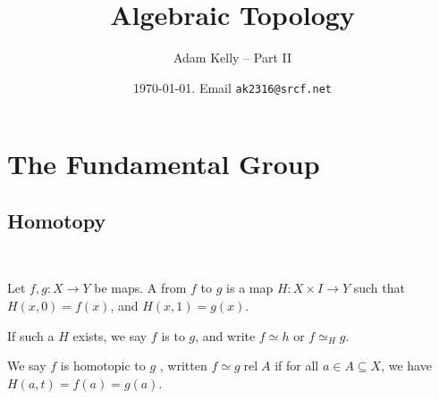 \documentclass[a4paper, 10pt, twocolumn]{amsart}
\title{Algebraic Topology}
\author{Adam Kelly -- Part II}
\date{\today. Email \texttt{ak2316@srcf.net}}
\newcommand{\rel}{\operatorname{rel}}
\begin{document}
\maketitle

\section{The Fundamental Group}

\subsection{Homotopy}\ 

\begin{definition}[Homotopy]
Let $f, g: X \rightarrow Y$ be maps. A  from $f$ to $g$ is a map
  $
  H: X \times I \rightarrow Y
  $
  such that
  $
  H(x, 0)=f(x)$, and $H(x, 1)=g(x)
  $.

  If such a $H$ exists, we say $f$ is  to $g$, and write $f \simeq h$ or $f \simeq_H g$.
\end{definition}

\begin{definition}
  We say $f$ is homotopic to $g$ , written $f \simeq g \rel A$ if for all $a \in A \subseteq X$, we have $H(a, t) = f(a) = g(a)$.
\end{definition}
\end{document}
